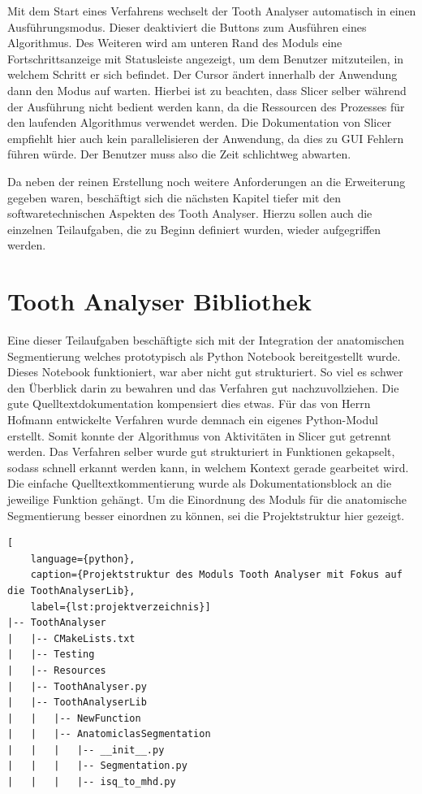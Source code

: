 Mit dem Start eines Verfahrens wechselt der Tooth Analyser automatisch in einen
Ausführungsmodus. Dieser deaktiviert die Buttons zum Ausführen eines Algorithmus.
Des Weiteren wird am unteren Rand des Moduls eine Fortschrittsanzeige mit
Statusleiste angezeigt, um dem Benutzer mitzuteilen, in welchem Schritt er sich
befindet. Der Cursor ändert innerhalb der Anwendung dann den Modus auf warten.
Hierbei ist zu beachten, dass Slicer selber während der Ausführung nicht bedient
werden kann, da die Ressourcen des Prozesses für den laufenden Algorithmus
verwendet werden. Die Dokumentation von Slicer empfiehlt hier auch kein parallelisieren
der Anwendung, da dies zu \ac{GUI} Fehlern führen würde. Der Benutzer muss also
die Zeit schlichtweg abwarten.

Da neben der reinen Erstellung noch weitere Anforderungen an die Erweiterung
gegeben waren, beschäftigt sich die nächsten Kapitel tiefer mit den softwaretechnischen
Aspekten des Tooth Analyser. Hierzu sollen auch die einzelnen Teilaufgaben, die zu
Beginn definiert wurden, wieder aufgegriffen werden.

\section{Tooth Analyser Bibliothek}
Eine dieser Teilaufgaben beschäftigte sich mit der Integration der anatomischen
Segmentierung welches prototypisch als Python Notebook bereitgestellt wurde. Dieses
Notebook funktioniert, war aber nicht gut strukturiert. So viel es schwer den Überblick
darin zu bewahren und das Verfahren gut nachzuvollziehen. Die gute
Quelltextdokumentation kompensiert dies etwas. Für das von Herrn Hofmann entwickelte
Verfahren wurde demnach ein eigenes Python-Modul erstellt. Somit konnte der
Algorithmus von Aktivitäten in Slicer gut getrennt werden. Das Verfahren selber wurde
gut strukturiert in Funktionen gekapselt, sodass schnell erkannt werden kann, in
welchem Kontext gerade gearbeitet wird. Die einfache Quelltextkommentierung
wurde als Dokumentationsblock an die jeweilige Funktion gehängt. Um die Einordnung
des Moduls für die anatomische Segmentierung besser einordnen zu können, sei die
Projektstruktur hier gezeigt.

\begin{lstlisting}[
    language={python},
    caption={Projektstruktur des Moduls Tooth Analyser mit Fokus auf die ToothAnalyserLib},
    label={lst:projektverzeichnis}]
|-- ToothAnalyser
|   |-- CMakeLists.txt
|   |-- Testing
|   |-- Resources
|   |-- ToothAnalyser.py
|   |-- ToothAnalyserLib
|   |   |-- NewFunction
|   |   |-- AnatomiclasSegmentation
|   |   |   |-- __init__.py
|   |   |   |-- Segmentation.py
|   |   |   |-- isq_to_mhd.py
\end{lstlisting}

